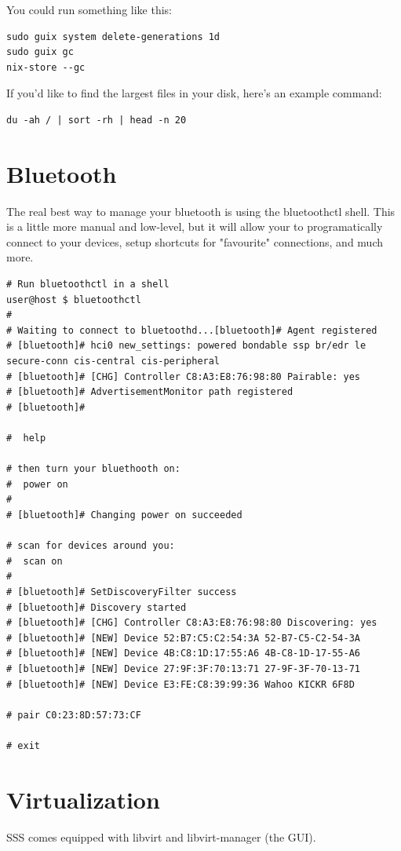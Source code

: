 \documentclass[11pt]{article}
\begin{document}
You could run something like this:
\begin{verbatim}
sudo guix system delete-generations 1d
sudo guix gc
nix-store --gc
\end{verbatim}

If you'd like to find the largest files in your disk, here’s an example command:  
\begin{verbatim}
du -ah / | sort -rh | head -n 20
\end{verbatim}

\section{Bluetooth}
\label{sec:org598fc3d}

The real best way to manage your bluetooth is using the bluetoothctl shell. This is a little more manual and low-level, but it will allow your to programatically connect to your devices, setup shortcuts for "favourite" connections, and much more.

\begin{verbatim}
# Run bluetoothctl in a shell
user@host $ bluetoothctl
#
# Waiting to connect to bluetoothd...[bluetooth]# Agent registered
# [bluetooth]# hci0 new_settings: powered bondable ssp br/edr le secure-conn cis-central cis-peripheral 
# [bluetooth]# [CHG] Controller C8:A3:E8:76:98:80 Pairable: yes
# [bluetooth]# AdvertisementMonitor path registered
# [bluetooth]#

#  help

# then turn your bluethooth on:
#  power on
#
# [bluetooth]# Changing power on succeeded

# scan for devices around you:
#  scan on
#
# [bluetooth]# SetDiscoveryFilter success
# [bluetooth]# Discovery started
# [bluetooth]# [CHG] Controller C8:A3:E8:76:98:80 Discovering: yes
# [bluetooth]# [NEW] Device 52:B7:C5:C2:54:3A 52-B7-C5-C2-54-3A
# [bluetooth]# [NEW] Device 4B:C8:1D:17:55:A6 4B-C8-1D-17-55-A6
# [bluetooth]# [NEW] Device 27:9F:3F:70:13:71 27-9F-3F-70-13-71
# [bluetooth]# [NEW] Device E3:FE:C8:39:99:36 Wahoo KICKR 6F8D

# pair C0:23:8D:57:73:CF 

# exit
\end{verbatim}

\section{Virtualization}
\label{sec:org245a92a}

SSS comes equipped with libvirt and libvirt-manager (the GUI).
\end{document}
